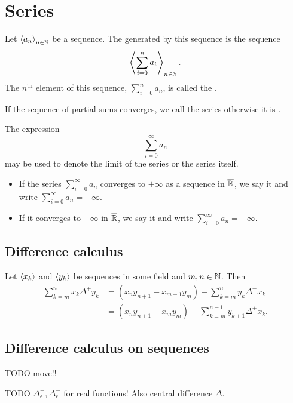 \section{Series}
\begin{definition}
Let $\left\langle a_n \right\rangle_{n\in \mathbb{N}}$ be a sequence. The  generated by this sequence is the sequence
\[ \left\langle \sum_{i=0}^n a_i \right\rangle_{n\in \mathbb{N}}. \]
The $n^\text{th}$ element of this sequence, $\sum_{i=0}^n a_n$, is called the .

If the sequence of partial sums converges, we call the series  otherwise it is .

The expression
\[ \sum_{i=0}^\infty a_n \]
may be used to denote the limit of the series or the series itself.
\begin{itemize}
\item If the series $\sum_{i=0}^\infty a_n$ converges to $+\infty$ as a sequence in $\overline{\mathbb{R}}$, we say it  and write $\sum_{i=0}^\infty a_n = +\infty$.
\item If it converges to $-\infty$ in $\overline{\mathbb{R}}$, we say it  and write $\sum_{i=0}^\infty a_n = -\infty$.
\end{itemize}
\end{definition}

\subsection{Difference calculus}

\begin{proposition}
Let $\left\langle x_k \right\rangle$ and $\left\langle y_k \right\rangle$ be sequences in some field and $m,n\in \mathbb{N}$. Then
\begin{align*}
\sum_{k=m}^n x_k\Delta^+y_k &= (x_ny_{n+1} - x_{m-1}y_m)-\sum_{k=m}^ny_k\Delta^-x_k \\
&= (x_ny_{n+1} - x_my_m) - \sum_{k=m}^{n-1}y_{k+1}\Delta^+x_k.
\end{align*}
\end{proposition}

\subsection{Difference calculus on sequences}
TODO move!!

TODO $\Delta^+_\epsilon, \Delta^-_\epsilon$ for real functions! Also central difference $\Delta$.
